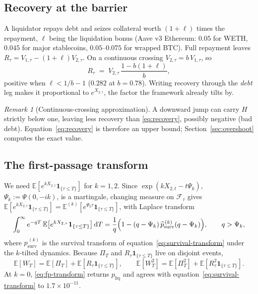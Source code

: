 \documentclass[11pt]{article}
\newcommand{\E}{\mathbb{E}}
\newcommand{\diff}{\mathrm{d}}
\newcommand{\F}{\mathcal{F}}
\newcommand{\one}{\mathbf{1}}
\theoremstyle{plain}
\theoremstyle{definition}
\theoremstyle{remark}
\newtheorem{remark}{Remark}
\begin{document}
\subsection{Recovery at the barrier}
A liquidator repays debt and seizes collateral worth $(1+\ell)$ times the repayment, $\ell$ being the
liquidation bonus (Aave v3 Ethereum: $0.05$ for WETH, $0.045$ for major stablecoins, $0.05$--$0.075$
for wrapped BTC). Full repayment leaves $R_\tau=V_{1,\tau}-(1+\ell)V_{2,\tau}$. On a continuous
crossing $V_{2,\tau}=b\,V_{1,\tau}$, so
\begin{equation}\label{eq:recovery}
R_\tau \;=\; V_{2,\tau}\,\frac{1-b(1+\ell)}{b},
\end{equation}
positive when $\ell<1/b-1$ ($0.282$ at $b=0.78$). Writing recovery through the \emph{debt} leg makes
it proportional to $e^{X_{2,\tau}}$, the factor the framework already tilts by.

\begin{remark}[Continuous-crossing approximation]\label{rem:overshoot}
A downward jump can carry $H$ strictly below one, leaving less recovery than \eqref{eq:recovery},
possibly negative (bad debt). Equation~\eqref{eq:recovery} is therefore an upper bound;
Section~\ref{sec:overshoot} computes the exact value.
\end{remark}

\subsection{The first-passage transform}
We need $\E[e^{kX_{2,\tau}}\one_{\{\tau\le T\}}]$ for $k=1,2$. Since
$\exp(kX_{2,t}-t\Psi_k)$, $\Psi_k:=\Psi(0,-ik)$, is a martingale, changing measure on $\F_\tau$
gives $\E[e^{kX_{2,\tau}}\one_{\{\tau\le T\}}]=\E^{(k)}[e^{\Psi_k\tau}\one_{\{\tau\le T\}}]$, with
Laplace transform
\begin{equation}\label{eq:fp-transform}
\int_0^\infty e^{-qT}\,\E\!\left[e^{kX_{2,\tau}}\one_{\{\tau\le T\}}\right]\diff T
=\frac{1}{q}\Bigl(1-(q-\Psi_k)\,\widehat p^{\,(k)}_{\mathrm{surv}}(q-\Psi_k)\Bigr),
\qquad q>\Psi_k,
\end{equation}
where $\widehat p^{\,(k)}_{\mathrm{surv}}$ is the survival transform of
equation~\eqref{eq:survival-transform} under the $k$-tilted dynamics. Because $\Pi_T$ and
$R_\tau\one_{\{\tau\le T\}}$ live on disjoint events,
\begin{equation}\label{eq:wealth-moments}
\E[W_T]=\E[\Pi_T]+\E[R_\tau\one_{\{\tau\le T\}}],
\qquad
\E[W_T^2]=\E[\Pi_T^2]+\E[R_\tau^2\one_{\{\tau\le T\}}].
\end{equation}
At $k=0$, \eqref{eq:fp-transform} returns $p_{\mathrm{liq}}$ and agrees with
equation~\eqref{eq:survival-transform} to $1.7\times10^{-11}$.
\end{document}
